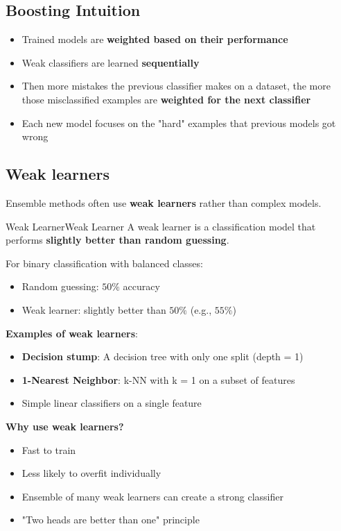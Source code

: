 \documentclass[a4paper]{article}
\theoremstyle{definition}
\begin{document}
\subsection{Boosting Intuition}
\begin{itemize}
    \item Trained models are \textbf{weighted based on their performance}
    \item Weak classifiers are learned \textbf{sequentially}
    \item Then more mistakes the previous classifier makes on a dataset, the more those misclassified examples are \textbf{weighted for the next classifier}
    \item Each new model focuses on the "hard" examples that previous models got wrong
\end{itemize}
\subsection{Weak learners}
Ensemble methods often use \textbf{weak learners} rather than complex models.
\begin{definition}{Weak Learner}{Weak Learner}
A weak learner is a classification model that performs \textbf{slightly better than random guessing}.
\end{definition}
For binary classification with balanced classes:
\begin{itemize}
    \item Random guessing: \( 50\% \) accuracy 
    \item Weak learner: slightly better than \( 50\% \) (e.g., $55\%$)
\end{itemize}
\textbf{Examples of weak learners}:
\begin{itemize}
    \item \textbf{Decision stump}: A decision tree with only one split (depth = 1)
    \item \textbf{1-Nearest Neighbor}: k-NN with k = 1 on a subset of features 
    \item Simple linear classifiers on a single feature
\end{itemize}
\textbf{Why use weak learners?}
\begin{itemize}
    \item Fast to train 
    \item Less likely to overfit individually 
    \item Ensemble of many weak learners can create a strong classifier
    \item "Two heads are better than one" principle
\end{itemize}
\end{document}
